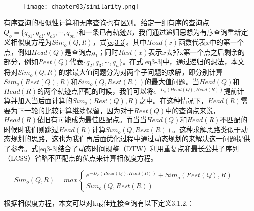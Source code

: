 \begin{figure}[!htp]
  \centering
  \texttt{[image: chapter03/similarity.png]}
\end{figure}

有序查询的相似性计算和无序查询也有区别。给定一组有序的查询点$Q_{o} = \{q_{o1},q_{o2},q_{o3},\cdots, q_{on}\}$和一条已有轨迹$R$，我们通过递归思想为有序查询重新定义相似度方程为$Sim_{o}(Q,R)$，式\ref{eq3-3}。其中$Head(x)$函数代表$x$中的第一个点，例如$Head(Q)$是查询点$q_{1}$；同时$Rest(x)$表示$x$去掉x第一个点之后剩余的部分，例如$Rest(Q)$代表\{$q_{2},q_{3},\cdots, q_{n}$\}。在式\ref{eq3-3}中，通过递归的想法，本文将对$Sim_{o}(Q,R)$的求最大值问题分为对两个子问题的求解，即分别计算$Sim_{o}(Rest(Q),R)$和$Sim_{o}(Q,Rest(R))$的最大值问题。当$Head(Q)$和$Head(R)$的两个轨迹点匹配的时候，我们可以将$e^{-D_{e}(Head(Q), Head(R))}$提前计算并加入当后面计算的$Sim_{o}(Rest(Q),R)$之中。在这种情况下，$Head(R)$需要为下一轮的比较计算继续保留，因为对于$Rest(Q)$中的查询点来说，$Head(R)$依旧有可能成为最佳匹配点。而当当$Head(Q)$和$Head(R)$不匹配的时候时我们则跳过$Head(R)$计算$Sim_{o}(Q,Rest(R))$。这种求解思路类似于动态规划的思路，这也为我们再后面优化过程中通过动态规划的来解决这一问题提供了参考。式\ref{eq3-3}结合了动态时间规整（DTW）利用重复点和最长公共子序列（LCSS）省略不匹配点的优点来计算相似度方程。

\begin{equation} 
\label{eq3-3} 
Sim_{o}(Q,R)= max \left\{  
	\begin{array}{lr}  
    e^{-D_{e}(Head(Q), Head(R))} + Sim_{o}(Rest(Q),R) & \\
    Sim_{o}(Q,Rest(R)) &  
    \end{array}  
\right.  
\end{equation}  

根据相似度方程，本文可以对k最佳连接查询有以下定义3.1.2.：


